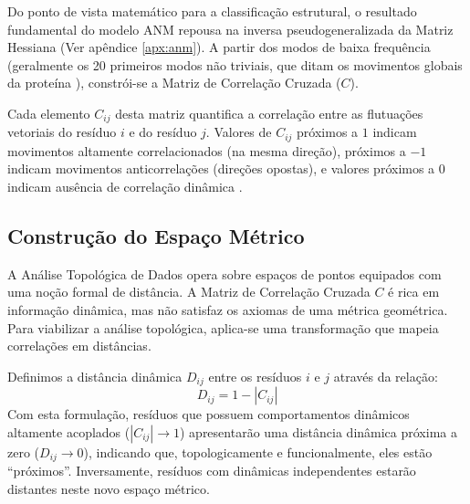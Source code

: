 \documentclass[12pt, a4paper]{article}
\theoremstyle{plain}
\theoremstyle{definition}
\theoremstyle{remark}
\newcommand{\ident}{\hspace{2em}}
\begin{document}
\ident Do ponto de vista matemático para a classificação estrutural, o resultado fundamental do modelo ANM repousa na inversa pseudogeneralizada da Matriz Hessiana (Ver apêndice \ref{apx:anm}). A partir dos modos de baixa frequência (geralmente os 20 primeiros modos não triviais, que ditam os movimentos globais da proteína \cite{atilgan2001, kovacev2016}), constrói-se a Matriz de Correlação Cruzada ($C$). 

\ident Cada elemento $C_{ij}$ desta matriz quantifica a correlação entre as flutuações vetoriais do resíduo $i$ e do resíduo $j$. Valores de $C_{ij}$ próximos a $1$ indicam movimentos altamente correlacionados (na mesma direção), próximos a $-1$ indicam movimentos anticorrelações (direções opostas), e valores próximos a $0$ indicam ausência de correlação dinâmica \cite{kovacev2016}.

\subsection{Construção do Espaço Métrico}

\ident A Análise Topológica de Dados opera sobre espaços de pontos equipados com uma noção formal de distância. A Matriz de Correlação Cruzada $C$ é rica em informação dinâmica, mas não satisfaz os axiomas de uma métrica geométrica. Para viabilizar a análise topológica, aplica-se uma transformação que mapeia correlações em distâncias.

\ident Definimos a distância dinâmica $D_{ij}$ entre os resíduos $i$ e $j$ através da relação:
\begin{equation}
    D_{ij} = 1 - |C_{ij}|
\end{equation}
\ident Com esta formulação, resíduos que possuem comportamentos dinâmicos altamente acoplados ($|C_{ij}| \to 1$) apresentarão uma distância dinâmica próxima a zero ($D_{ij} \to 0$), indicando que, topologicamente e funcionalmente, eles estão ``próximos''. Inversamente, resíduos com dinâmicas independentes estarão distantes neste novo espaço métrico.
\end{document}
